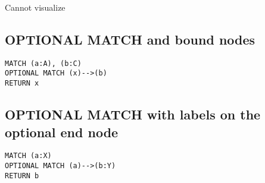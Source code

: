 Cannot visualize
\subsection{OPTIONAL MATCH and bound nodes}

\begin{lstlisting}
MATCH (a:A), (b:C)
OPTIONAL MATCH (x)-->(b)
RETURN x
\end{lstlisting}

\subsection{OPTIONAL MATCH with labels on the optional end node}

\begin{lstlisting}
MATCH (a:X)
OPTIONAL MATCH (a)-->(b:Y)
RETURN b
\end{lstlisting}

